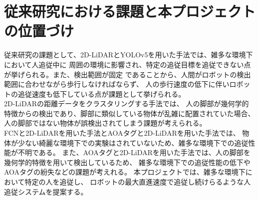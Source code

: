 \clearpage

\section{従来研究における課題と本プロジェクトの位置づけ}
従来研究の課題として、2D-LiDARとYOLOv5を用いた手法では、雑多な環境下において人追従中に
周囲の環境に影響され、特定の追従目標を追従できない点が挙げられる。また、検出範囲が固定
であることから、人間がロボットの検出範囲に合わせながら歩行しなければならず、
人の歩行速度の低下に伴いロボットの追従速度も低下している点が課題として挙げられる。\\ \indent
2D-LiDARの距離データをクラスタリングする手法では、
人の脚部が幾何学的特徴からの検出であり、脚部に類似している物体が乱雑に配置されていた場合、
人の脚部ではない物体が誤検出されてしまう課題が考えられる。\\ \indent
FCNと2D-LiDARを用いた手法とAOAタグと2D-LiDARを用いた手法では、
物体が少ない綺麗な環境下での実験はされていないため、雑多な環境下での追従性能が不明である。
また、AOAタグと2D-LiDARを用いた手法では、人の脚部を幾何学的特徴を用いて検出しているため、
雑多な環境下での追従性能の低下やAOAタグの紛失などの課題が考えれる。
本プロジェクトでは、雑多な環境下において特定の人を追従し、
ロボットの最大直進速度で追従し続けらるような人追従システムを提案する。